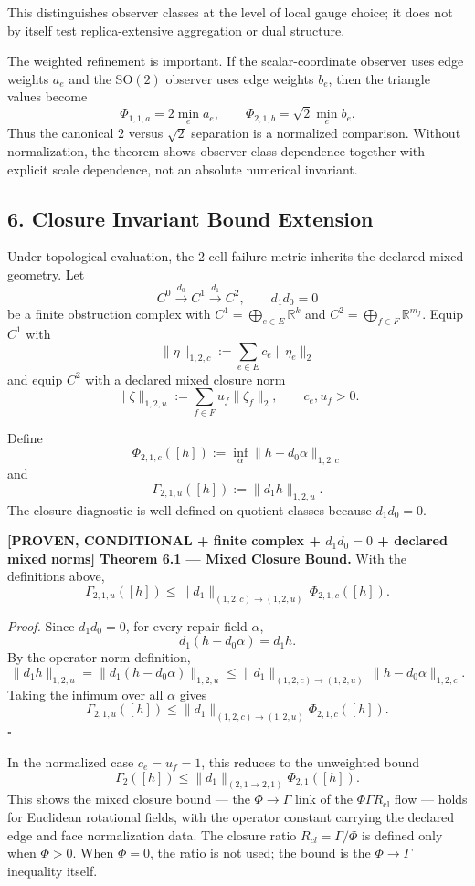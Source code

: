 \documentclass[
  11pt,
]{article}
\begin{document}
This distinguishes observer classes at the level of local gauge choice;
it does not by itself test replica-extensive aggregation or dual
structure.

The weighted refinement is important. If the scalar-coordinate observer
uses edge weights \(a_e\) and the \(\mathrm{SO}(2)\) observer uses edge
weights \(b_e\), then the triangle values become \[
\Phi_{1,1,a}=2\min_e a_e,
\qquad
\Phi_{2,1,b}=\sqrt2\min_e b_e.
\] Thus the canonical \(2\) versus \(\sqrt2\) separation is a normalized
comparison. Without normalization, the theorem shows observer-class
dependence together with explicit scale dependence, not an absolute
numerical invariant.

\subsection{6. Closure Invariant Bound
Extension}\label{closure-invariant-bound-extension}

Under topological evaluation, the 2-cell failure metric inherits the
declared mixed geometry. Let \[
C^0\xrightarrow{d_0}C^1\xrightarrow{d_1}C^2,
\qquad
d_1d_0=0
\] be a finite obstruction complex with
\(C^1=\bigoplus_{e\in E}\mathbb R^k\) and
\(C^2=\bigoplus_{f\in F}\mathbb R^{m_f}\). Equip \(C^1\) with \[
\|\eta\|_{1,2,c}:=\sum_{e\in E}c_e\|\eta_e\|_2
\] and equip \(C^2\) with a declared mixed closure norm \[
\|\zeta\|_{1,2,u}:=\sum_{f\in F}u_f\|\zeta_f\|_2,
\qquad
c_e,u_f>0.
\]

Define \[
\Phi_{2,1,c}([h])
:=
\inf_\alpha \|h-d_0\alpha\|_{1,2,c}
\] and \[
\Gamma_{2,1,u}([h])
:=
\|d_1h\|_{1,2,u}.
\] The closure diagnostic is well-defined on quotient classes because
\(d_1d_0=0\).

\textbf{{[}PROVEN, CONDITIONAL + finite complex + \(d_1d_0=0\) +
declared mixed norms{]} Theorem 6.1 --- Mixed Closure Bound.} With the
definitions above, \[
\Gamma_{2,1,u}([h])
\le
\|d_1\|_{(1,2,c)\to(1,2,u)}
\,
\Phi_{2,1,c}([h]).
\]

\emph{Proof.} Since \(d_1d_0=0\), for every repair field \(\alpha\), \[
d_1(h-d_0\alpha)=d_1h.
\] By the operator norm definition, \[
\|d_1h\|_{1,2,u}=
\|d_1(h-d_0\alpha)\|_{1,2,u}
\le
\|d_1\|_{(1,2,c)\to(1,2,u)}
\,
\|h-d_0\alpha\|_{1,2,c}.
\] Taking the infimum over all \(\alpha\) gives \[
\Gamma_{2,1,u}([h])
\le
\|d_1\|_{(1,2,c)\to(1,2,u)}
\Phi_{2,1,c}([h]).
\] \(\square\)

In the normalized case \(c_e=u_f=1\), this reduces to the unweighted
bound \[
\Gamma_2([h])
\le
\|d_1\|_{(2,1\to2,1)}
\Phi_{2,1}([h]).
\] This shows the mixed closure bound --- the \(\Phi\to\Gamma\) link of
the \(\Phi\Gamma R_{\mathrm{cl}}\) flow --- holds for Euclidean
rotational fields, with the operator constant carrying the declared edge
and face normalization data. The closure ratio \(R_{cl}=\Gamma/\Phi\) is
defined only when \(\Phi>0\). When \(\Phi=0\), the ratio is not used;
the bound is the \(\Phi\to\Gamma\) inequality itself.
\end{document}
